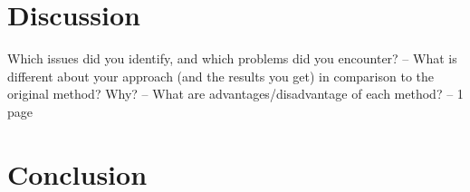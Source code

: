 \documentclass[a4paper, 11pt, twocolumn]{article}
\begin{document}
\begin{multicols}{2}
\section{Discussion}
Which issues did you identify, and which problems
did you encounter?
– What is different about your approach (and the
results you get) in comparison to the original
method? Why?
– What are advantages/disadvantage of each
method?
– 1 page
\section{Conclusion} 


\end{multicols}
\end{document}

